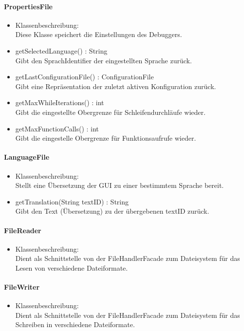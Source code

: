 ﻿\documentclass[parskip=full]{scrartcl}
\begin{document}
\paragraph{PropertiesFile}
\begin{itemize}
\item Klassenbeschreibung: \\
Diese Klasse speichert die Einstellungen des Debuggers.
\item getSelectedLanguage() : String \\
Gibt den SprachIdentifier der eingestellten Sprache zurück.
\item getLastConfigurationFile() : ConfigurationFile \\
Gibt eine Repräsentation der zuletzt aktiven Konfiguration zurück.
\item getMaxWhileIterations() : int \\
Gibt die eingestellte Obergrenze für Schleifendurchläufe wieder.
\item getMaxFunctionCalls() : int \\
Gibt die eingestelle Obergrenze für Funktionsaufrufe wieder.
\end{itemize}

\paragraph{LanguageFile}
\begin{itemize}
\item Klassenbeschreibung: \\
Stellt eine Übersetzung der GUI zu einer bestimmtem Sprache bereit.
\item getTranslation(String textID) : String \\
Gibt den Text (Übersetzung) zu der übergebenen textID zurück.
\end{itemize}

\paragraph{FileReader}%
\begin{itemize}
\item Klassenbeschreibung: \\
Dient als Schnittstelle von der FileHandlerFacade zum Dateisystem für das Lesen von verschiedene Dateiformate.
\end{itemize}

\paragraph{FileWriter}%
\begin{itemize}
\item Klassenbeschreibung: \\
Dient als Schnittstelle von der FileHandlerFacade zum Dateisystem für das Schreiben in verschiedene Dateiformate.
\end{itemize}
\end{document}
